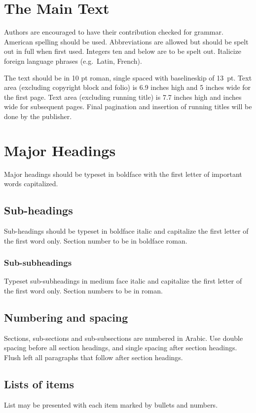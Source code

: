 \documentclass{ws-ijtaf}
\begin{document}
\section{The Main Text}

Authors are encouraged to have their contribution checked for grammar.
American spelling should be used. Abbreviations are allowed but should
be spelt out in full when first used. Integers ten and below are to be
spelt out. Italicize foreign language phrases (e.g.~Latin, French).

The text should be in 10 pt roman, single spaced with
baselineskip of 13~pt. Text area (excluding copyright block and folio)
is 6.9 inches high and 5 inches wide for the first page.
Text area (excluding running title) is 7.7 inches high and inches wide for subsequent pages.  Final pagination and
insertion of running titles will be done by the publisher.

\section{Major Headings}
Major headings should be typeset in boldface with the first letter of
important words capitalized.

\subsection{Sub-headings}
Sub-headings should be typeset in boldface italic and capitalize the
first letter of the first word only. Section number to be in boldface
roman.

\subsubsection{Sub-subheadings}
Typeset sub-subheadings in medium face italic and capitalize the first
letter of the first word only. Section numbers to be in roman.

\subsection{Numbering and spacing}
Sections, sub-sections and sub-subsections are numbered in Arabic.
Use double spacing before all section headings, and single spacing
after section headings. Flush left all paragraphs that follow after
section headings.

\subsection{Lists of items}
List may be presented with each item marked by bullets and numbers.
\end{document}
